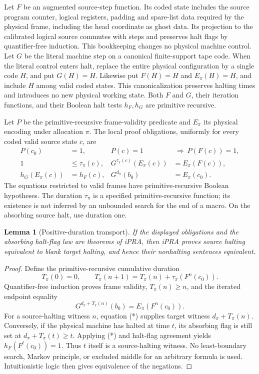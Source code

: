 \documentclass[11pt,letterpaper]{article}
\newtheorem{lemma}[theorem]{Lemma}
\begin{document}
Let $F$ be an augmented source-step function. Its coded state includes the source program counter, logical registers, padding and spare-list data required by the physical frame, including the head coordinate as ghost data. Its projection to the calibrated logical source commutes with steps and preserves halt flags by quantifier-free induction. This bookkeeping changes no physical machine control. Let $G$ be the literal machine step on a canonical finite-support tape code. When the literal control enters halt, replace the entire physical configuration by a single code $H$, and put $G(H)=H$. Likewise put $F(H)=H$ and $E_\pi(H)=H$, and include $H$ among valid coded states. This canonicalization preserves halting times and introduces no new physical working state. Both $F$ and $G$, their iteration functions, and their Boolean halt tests $h_F,h_G$ are primitive recursive.

Let $P$ be the primitive-recursive frame-validity predicate and $E_\pi$ its physical encoding under allocation $\pi$. The local proof obligations, uniformly for every coded valid source state $c$, are
\begin{align}
 P(c_0)&=1, & P(c)=1&\ \Longrightarrow\ P(F(c))=1,\\
 1&\le\tau_\pi(c), &
 G^{\tau_\pi(c)}(E_\pi(c))&=E_\pi(F(c)),\label{eq:local}\\
 h_G(E_\pi(c))&=h_F(c), &
 G^{d_\pi}(b_0)&=E_\pi(c_0).\label{eq:startup}
\end{align}
The equations restricted to valid frames have primitive-recursive Boolean hypotheses. The duration $\tau_\pi$ is a specified primitive-recursive function; its existence is not inferred by an unbounded search for the end of a macro. On the absorbing source halt, use duration one.

\begin{lemma}[Positive-duration transport]\label{lem:transport}
If the displayed obligations and the absorbing halt-flag law are theorems of iPRA, then iPRA proves source halting equivalent to blank target halting, and hence their nonhalting sentences equivalent.
\end{lemma}
\begin{proof}
Define the primitive-recursive cumulative duration
\[
 T_\pi(0)=0,\qquad T_\pi(n+1)=T_\pi(n)+\tau_\pi(F^n(c_0)).
\]
Quantifier-free induction proves frame validity, $T_\pi(n)\ge n$, and the iterated endpoint equality
\[
       G^{d_\pi+T_\pi(n)}(b_0)=E_\pi(F^n(c_0)).\tag{*}
\]
For a source-halting witness $n$, equation (*) supplies target witness $d_\pi+T_\pi(n)$. Conversely, if the physical machine has halted at time $t$, its absorbing flag is still set at $d_\pi+T_\pi(t)\ge t$. Applying (*) and halt-flag agreement yields $h_F(F^t(c_0))=1$. Thus $t$ itself is a source-halting witness. No least-boundary search, Markov principle, or excluded middle for an arbitrary formula is used. Intuitionistic logic then gives equivalence of the negations.
\end{proof}
\end{document}

